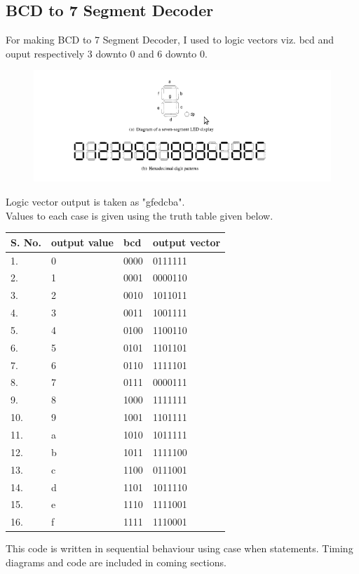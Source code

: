 \documentclass[12pt]{article}
\begin{document}
\subsection{BCD to 7 Segment Decoder}
For making BCD to 7 Segment Decoder, I used to logic vectors viz. bcd and ouput respectively 3 downto 0 and 6 downto 0. 
\begin{figure}[!ht]
\centering
\includegraphics[scale=0.5]{pic}
\end{figure}
Logic vector output is taken as "gfedcba". \\
Values to each case is given using the truth table given below.
\begin{center}
\begin{tabular}{| l | l | l | l |}
\hline
S. No. & output value & bcd & output vector \\ \hline
1. & 0 & 0000 & 0111111 \\ \hline
2. & 1 & 0001 & 0000110 \\ \hline
3. & 2 & 0010 & 1011011 \\ \hline
4. & 3 & 0011 & 1001111 \\ \hline
5. & 4 & 0100 & 1100110 \\ \hline
6. & 5 & 0101 & 1101101 \\ \hline
7. & 6 & 0110 & 1111101 \\ \hline
8. & 7 & 0111 & 0000111 \\ \hline
9. & 8 & 1000 & 1111111 \\ \hline
10. & 9 & 1001 & 1101111 \\ \hline
11. & a & 1010 & 1011111 \\ \hline
12. & b & 1011 & 1111100 \\ \hline
13. & c & 1100 & 0111001 \\ \hline
14. & d & 1101 & 1011110 \\ \hline
15. & e & 1110 & 1111001 \\ \hline
16. & f & 1111 & 1110001 \\ \hline
\end{tabular}
\end{center}
This code is written in sequential behaviour using case when statements. 
Timing diagrams and code are included in coming sections.
\end{document}
